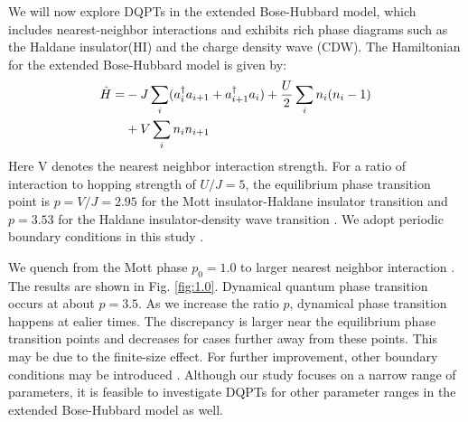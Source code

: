 \documentclass[%
reprint,
superscriptaddress,
amsmath,amssymb,
aps,
pra,
floatfix,
]{revtex4-1}
\begin{document}
We will now explore DQPTs in the extended Bose-Hubbard model, which includes nearest-neighbor interactions and exhibits rich phase diagrams such as the Haldane insulator(HI) and the charge density wave (CDW). The Hamiltonian for the extended Bose-Hubbard model is given by:
\begin{align}
	\hat{H}=&-J\sum_i (a_{i}^{\dagger} a_{i+1}+a_{i+1}^{\dagger} a_{i})+\frac{U}{2}\sum_{i} n_{i}(n_{i}-1)\\ \notag
&+	V\sum_i n_i n_{i+1}
\end{align}
Here V denotes the nearest neighbor interaction strength.  For a ratio of interaction to hopping strength of $U/J=5$, the equilibrium phase transition point is $p=V/J=2.95$ for the Mott insulator-Haldane insulator transition and $p=3.53$ for the Haldane insulator-density wave transition \cite{rossini2012}. We adopt periodic boundary conditions in this study \cite{stumper2020,ejima2014}.


We quench from the Mott phase $p_0=1.0$ to larger nearest neighbor interaction \cite{stumper2022}. The results are shown in Fig. \ref{fig:1.0}. Dynamical quantum phase transition occurs at about $p=3.5$. As we increase the ratio $p$, dynamical phase transition happens at ealier times. The discrepancy is larger near the equilibrium phase transition points and decreases for cases further away from these points. This may be due to  the finite-size effect. For further improvement, other boundary conditions may be introduced \cite{peotta2021}. 
Although our study focuses on a narrow range of parameters, it is feasible to investigate DQPTs for other parameter ranges in the extended Bose-Hubbard model as well.



%


%
\end{document}
